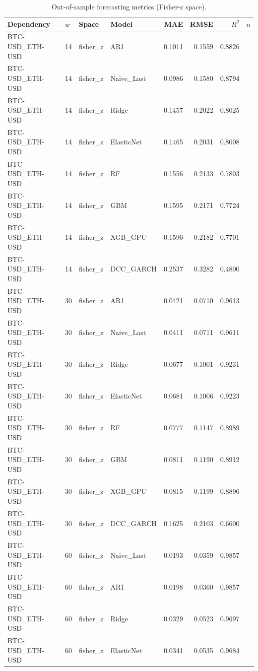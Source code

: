 \begin{table}[H]
\centering
\small
\caption{Out-of-sample forecasting metrics (Fisher-z space).}
\label{tab:model_comparison}
\begin{tabular}{llllrrrr}
\toprule
Dependency & $w$ & Space & Model & MAE & RMSE & $R^2$ & $n$ \\
\midrule
BTC-USD_ETH-USD & 14 & fisher_z & AR1 & 0.1011 & 0.1559 & 0.8826 &  \\
BTC-USD_ETH-USD & 14 & fisher_z & Naive_Last & 0.0986 & 0.1580 & 0.8794 &  \\
BTC-USD_ETH-USD & 14 & fisher_z & Ridge & 0.1457 & 0.2022 & 0.8025 &  \\
BTC-USD_ETH-USD & 14 & fisher_z & ElasticNet & 0.1465 & 0.2031 & 0.8008 &  \\
BTC-USD_ETH-USD & 14 & fisher_z & RF & 0.1556 & 0.2133 & 0.7803 &  \\
BTC-USD_ETH-USD & 14 & fisher_z & GBM & 0.1595 & 0.2171 & 0.7724 &  \\
BTC-USD_ETH-USD & 14 & fisher_z & XGB_GPU & 0.1596 & 0.2182 & 0.7701 &  \\
BTC-USD_ETH-USD & 14 & fisher_z & DCC_GARCH & 0.2537 & 0.3282 & 0.4800 &  \\
BTC-USD_ETH-USD & 30 & fisher_z & AR1 & 0.0421 & 0.0710 & 0.9613 &  \\
BTC-USD_ETH-USD & 30 & fisher_z & Naive_Last & 0.0411 & 0.0711 & 0.9611 &  \\
BTC-USD_ETH-USD & 30 & fisher_z & Ridge & 0.0677 & 0.1001 & 0.9231 &  \\
BTC-USD_ETH-USD & 30 & fisher_z & ElasticNet & 0.0681 & 0.1006 & 0.9223 &  \\
BTC-USD_ETH-USD & 30 & fisher_z & RF & 0.0777 & 0.1147 & 0.8989 &  \\
BTC-USD_ETH-USD & 30 & fisher_z & GBM & 0.0811 & 0.1190 & 0.8912 &  \\
BTC-USD_ETH-USD & 30 & fisher_z & XGB_GPU & 0.0815 & 0.1199 & 0.8896 &  \\
BTC-USD_ETH-USD & 30 & fisher_z & DCC_GARCH & 0.1625 & 0.2103 & 0.6600 &  \\
BTC-USD_ETH-USD & 60 & fisher_z & Naive_Last & 0.0193 & 0.0359 & 0.9857 &  \\
BTC-USD_ETH-USD & 60 & fisher_z & AR1 & 0.0198 & 0.0360 & 0.9857 &  \\
BTC-USD_ETH-USD & 60 & fisher_z & Ridge & 0.0329 & 0.0523 & 0.9697 &  \\
BTC-USD_ETH-USD & 60 & fisher_z & ElasticNet & 0.0341 & 0.0535 & 0.9684 &  \\

\end{tabular}
\end{table}
